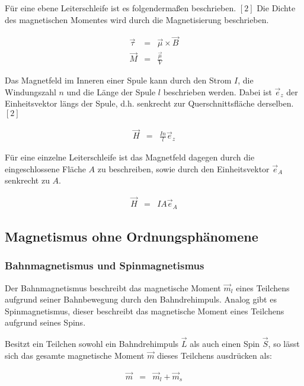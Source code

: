 \documentclass[12pt,a4paper]{scrartcl}
\numberwithin{equation}{section} %
\renewcommand{\[}{} %
\renewcommand{\]}{\noindent} %
\begin{document}
Für eine ebene Leiterschleife ist es folgendermaßen beschrieben. \([2]\)
Die Dichte des magnetischen Momentes wird durch die Magnetisierung
beschrieben.

\[
\begin{eqnarray}
    \vec \tau &=& \vec \mu \times \vec B \\
    \vec M &=& \frac{\vec \mu}{V}
\end{eqnarray}
\]

Das Magnetfeld im Inneren einer Spule kann durch den Strom \(I\), die
Windungszahl \(n\) und die Länge der Spule \(l\) beschrieben werden.
Dabei ist \(\vec e_z\) der Einheitsvektor längs der Spule, d.h.
senkrecht zur Querschnittsfläche derselben. \([2]\)

\[
\begin{eqnarray}
    \vec H &=& \frac{In}{l} \vec e_z
\end{eqnarray}
\]

Für eine einzelne Leiterschleife ist das Magnetfeld dagegen durch die
eingeschlossene Fläche \(A\) zu beschreiben, sowie durch den
Einheitsvektor \(\vec e_A\) senkrecht zu \(A\).

\[
\begin{eqnarray}
    \vec H &=& IA \vec e_A
\end{eqnarray}
\]

\hypertarget{magnetismus-ohne-ordnungsphuxe4nomene}{%
\subsection{Magnetismus ohne
Ordnungsphänomene}\label{magnetismus-ohne-ordnungsphuxe4nomene}}

\hypertarget{bahnmagnetismus-und-spinmagnetismus}{%
\subsubsection{Bahnmagnetismus und
Spinmagnetismus}\label{bahnmagnetismus-und-spinmagnetismus}}

Der Bahnmagnetismus beschreibt das magnetische Moment \(\vec m_l\) eines
Teilchens aufgrund seiner Bahnbewegung durch den Bahndrehimpuls. Analog
gibt es Spinmagnetismus, dieser beschreibt das magnetische Moment eines
Teilchens aufgrund seines Spins.

Besitzt ein Teilchen sowohl ein Bahndrehimpuls \(\vec L\) als auch einen
Spin \(\vec S\), so lässt sich das gesamte magnetische Moment
\(\vec{m}\) dieses Teilchens ausdrücken als:

\[
\begin{eqnarray}
    \vec m &=& \vec m_l + \vec m_s
\end{eqnarray}
\]
\end{document}
